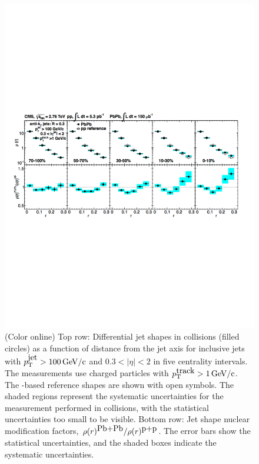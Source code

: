 \begin{figure}[!h]
\begin{center}
\includegraphics[width=0.98\mboxwidth]{jetfigures/JetShapes_GR.pdf}
\caption{\label{fig:JSRatio}
(Color online) Top row: Differential jet shapes in \PbPb collisions (filled circles)
 as a function of distance from the jet axis for inclusive jets with $p_{\rm{T}}^{\mbox{jet}} >100\,\mathrm{GeV/c}$ 
and $0.3 < |\eta| < 2$ in
five \PbPb centrality intervals. The measurements use charged particles with  $p_{\rm{T}}^{\mbox{track}} > 1\,\mathrm{GeV/c}$.
The \pp-based reference shapes  are shown with open symbols.
The shaded regions represent the systematic uncertainties for the measurement performed in \PbPb collisions, with the
statistical uncertainties too small to be visible.
Bottom row: Jet shape nuclear modification factors, $\rho(r)^{\mbox{Pb+Pb}}/\rho(r)^{\mbox{p+p}}$.
The error bars show the statistical uncertainties, and the shaded boxes indicate the systematic uncertainties. }
\label{fig:GR:CMS_jetshapes}
\end{center}
\end{figure}

